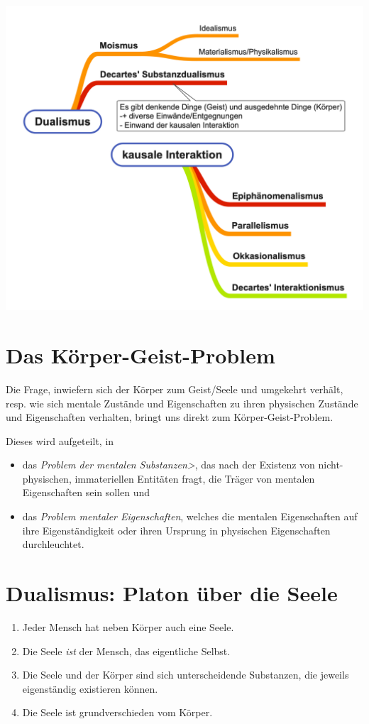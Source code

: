 \documentclass[../main.tex]{subfiles}
\begin{document}
\includegraphics[width=\textwidth]{images/Dualismus_Uebersicht.png}

\section{Das Körper-Geist-Problem} 
Die Frage, inwiefern sich der Körper zum Geist/Seele und umgekehrt verhält, resp. wie sich mentale Zustände und Eigenschaften zu ihren physischen Zustände und Eigenschaften verhalten, bringt uns direkt zum Körper-Geist-Problem. 

Dieses wird aufgeteilt, in 
\begin{itemize}
	\item das \textit{Problem der mentalen Substanzen>}, das nach der Existenz von nicht-physischen, immateriellen Entitäten fragt, die Träger von mentalen Eigenschaften sein sollen und
	\item das \textit{Problem mentaler Eigenschaften}, welches die mentalen Eigenschaften auf ihre Eigenständigkeit oder ihren Ursprung in physischen Eigenschaften durchleuchtet. 
\end{itemize}

\section{Dualismus: Platon über die Seele}
\begin{enumerate}
	\item Jeder Mensch hat neben Körper auch eine Seele.
	\item Die Seele \textit{ist} der Mensch, das eigentliche Selbst. 
	\item Die Seele und der Körper sind sich unterscheidende Substanzen, die jeweils eigenständig existieren können. 
	\item Die Seele ist grundverschieden vom Körper.
\end{enumerate}
\end{document}
